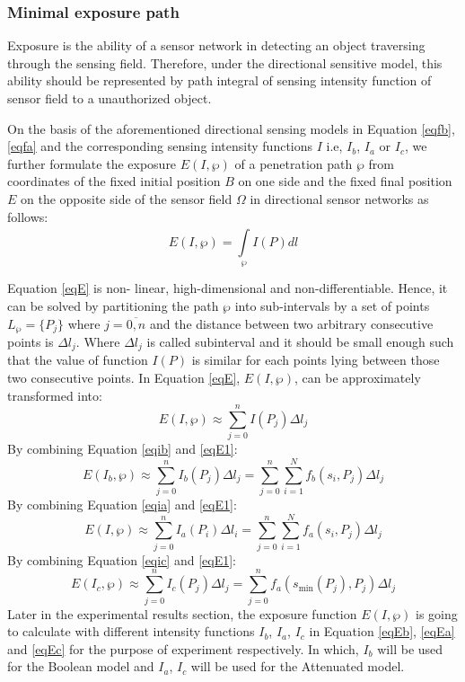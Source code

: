 \documentclass[final]{elsarticle}
\begin{document}
\subsubsection{Minimal exposure path}
Exposure is the ability of a sensor network in detecting an object traversing through the sensing field. Therefore, under the directional sensitive model, this ability should be represented by path integral of sensing intensity function of sensor field to a unauthorized object. 

On the basis of the aforementioned directional sensing models in Equation \eqref{eqfb}, \eqref{eqfa} and the corresponding sensing intensity functions $I$ i.e, $ I_b $, $ I_a $ or $ I_c $, we further formulate the exposure $ E(I,\wp )$ of a penetration path $ \wp $ from coordinates of the fixed initial position $ B $ on one side and the fixed final position $ E $ on the opposite side of the sensor field $ \Omega $ in directional sensor networks as follows:
 \begin{equation}
 \label{eqE}
E(I,\wp ) = \int\limits_{\wp }^{} {I(P)} dl
 \end{equation}

Equation \eqref{eqE} is non- linear, high-dimensional and non-differentiable. Hence,
it can be solved by partitioning the path $\wp $ into sub-intervals by a set
of points ${L_\wp } = \{ {P_j}\} $ where $j = \overline {0,n} $ and the distance between two arbitrary consecutive points is $\Delta l_j$. Where $\Delta l_j$ is called subinterval and it should be small enough such that the value of function $ {I(P)} $ is similar for each points
lying between those two consecutive points. In Equation \eqref{eqE}, $ E(I,\wp ) $, can be approximately transformed into:
\begin{equation}
\label{eqE1}
E(I,\wp ) \approx \sum\limits_{j = 0}^n {I(P_j)\Delta l_j} 
\end{equation}
By combining Equation \eqref{eqib} and \eqref{eqE1}:
\begin{equation}
\label{eqEb}
E(I_b,\wp ) \approx \sum\limits_{j = 0}^n {{I_b}(P_j)\Delta l_j}  = \sum\limits_{j = 0}^n {\sum\limits_{i = 1}^N {f_b(s_i,P_j)} } \Delta l_j
\end{equation}
By combining Equation \eqref{eqia} and \eqref{eqE1}:
\begin{equation}
\label{eqEa}
E(I,\wp ) \approx \sum\limits_{j = 0}^n {I_a(P_i)\Delta l_i}  = \sum\limits_{j = 0}^n {\sum\limits_{i = 1}^N {f_a({s_i},{P_j})} } \Delta l_j
\end{equation}
By combining Equation \eqref{eqic} and \ref{eqE1}:
\begin{equation}
\label{eqEc}
E(I_c,\wp ) \approx \sum\limits_{j = 0}^n {I_c(P_j)\Delta {l_j}}  = \sum\limits_{j = 0}^n {f_a(s_{\min }(P_j),P_j)} \Delta l_j
\end{equation}
 Later in the experimental results section, the exposure function $ E(I,\wp )$ is going to calculate with different intensity functions $ I_b $,  $ I_a $, $ I_c$ in Equation \eqref{eqEb}, \eqref{eqEa} and \eqref{eqEc} for the purpose of experiment respectively. In which, $ I_b $ will be used for the Boolean model and $ I_a $, $ I_c$ will be used for the Attenuated model.
\end{document}
